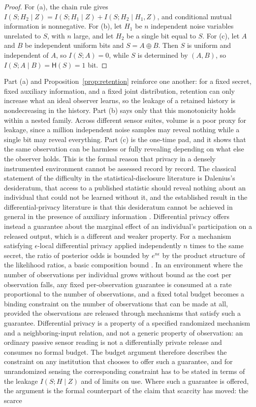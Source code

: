 \documentclass[11pt]{article}
\theoremstyle{plain}
\theoremstyle{definition}
\theoremstyle{remark}
\begin{document}
\begin{proof}
For (a), the chain rule gives $I(S;H_2\mid Z)=I(S;H_1\mid Z)+I(S;H_2\mid H_1,Z)$, and conditional mutual information is nonnegative. For (b), let $H_1$ be $n$ independent noise variables unrelated to $S$, with $n$ large, and let $H_2$ be a single bit equal to $S$. For (c), let $A$ and $B$ be independent uniform bits and $S=A\oplus B$. Then $S$ is uniform and independent of $A$, so $I(S;A)=0$, while $S$ is determined by $(A,B)$, so $I(S;A\mid B)=\mathsf{H}(S)=1$ bit.
\end{proof}

Part (a) and Proposition~\ref{prop:retention} reinforce one another: for a fixed secret, fixed auxiliary information, and a fixed joint distribution, retention can only increase what an ideal observer learns, so the leakage of a retained history is nondecreasing in the history. Part (b) says only that this monotonicity holds within a nested family. Across different sensor suites, volume is a poor proxy for leakage, since a million independent noise samples may reveal nothing while a single bit may reveal everything. Part (c) is the one-time pad, and it shows that the same observation can be harmless or fully revealing depending on what else the observer holds. This is the formal reason that privacy in a densely instrumented environment cannot be assessed record by record. The classical statement of the difficulty in the statistical-disclosure literature is Dalenius's desideratum, that access to a published statistic should reveal nothing about an individual that could not be learned without it, and the established result in the differential-privacy literature is that this desideratum cannot be achieved in general in the presence of auxiliary information \cite{dalenius1977,dwork2014}. Differential privacy offers instead a guarantee about the marginal effect of an individual's participation on a released output, which is a different and weaker property. For a mechanism satisfying $\epsilon$-local differential privacy applied independently $n$ times to the same secret, the ratio of posterior odds is bounded by $e^{n\epsilon}$ by the product structure of the likelihood ratios, a basic composition bound \cite{dwork2014}. In an environment where the number of observations per individual grows without bound as the cost per observation falls, any fixed per-observation guarantee is consumed at a rate proportional to the number of observations, and a fixed total budget becomes a binding constraint on the number of observations that can be made at all, provided the observations are released through mechanisms that satisfy such a guarantee. Differential privacy is a property of a specified randomized mechanism and a neighboring-input relation, and not a generic property of observation: an ordinary passive sensor reading is not a differentially private release and consumes no formal budget. The budget argument therefore describes the constraint on any institution that chooses to offer such a guarantee, and for unrandomized sensing the corresponding constraint has to be stated in terms of the leakage $I(S;H\mid Z)$ and of limits on use. Where such a guarantee is offered, the argument is the formal counterpart of the claim that scarcity has moved: the scarce 
\end{document}
